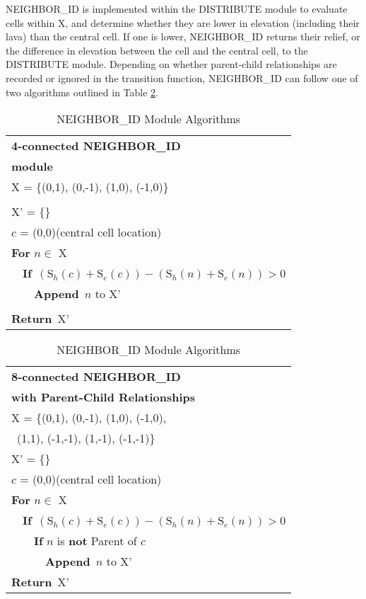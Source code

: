 		NEIGHBOR\_ID is implemented within the DISTRIBUTE module to evaluate cells within X, and determine whether they are lower in elevation (including their lava) than the central cell. If one is lower, NEIGHBOR\_ID returns their relief, or the difference in elevation between the cell and the central cell, to the DISTRIBUTE module. Depending on whether parent-child relationships are recorded or ignored in the transition function, NEIGHBOR\_ID can follow one of two algorithms outlined in Table \ref{tab_neighalg}.
	\begin{table}[h]
		\centering
		\caption{NEIGHBOR\_ID Module Algorithms}
		\begin{tabular}{l}
			\toprule
			\textbf{4-connected NEIGHBOR\_ID}\\
			\textbf{module}\\
			\midrule
			X = \{(0,1), (0,-1), (1,0), (-1,0)\}\\\\
			X' = \{\}\\
			$c$ = (0,0)\qquad (central cell location)\\
			\textbf{For} $n\in$ X\\
			~~\textbf{If}~$(\text{S}_h(c)+\text{S}_e(c))-(\text{S}_h(n)+\text{S}_e(n)) > 0$\\
			~~~~\textbf{Append}~$n$ to X'\\\\
			\textbf{Return}~X'\\
			\bottomrule
		\end{tabular}
		\begin{tabular}{l}
			\toprule
			\textbf{8-connected NEIGHBOR\_ID}\\
			\textbf{with Parent-Child Relationships}\\
			\midrule
			X = \{(0,1), (0,-1), (1,0), (-1,0), \\
			\qquad~(1,1), (-1,-1), (1,-1), (-1,-1)\}\\
			X' = \{\}\\
			$c$ = (0,0)\qquad (central cell location)\\
			\textbf{For} $n\in$ X\\
			~~\textbf{If}~$(\text{S}_h(c)+\text{S}_e(c))-(\text{S}_h(n)+\text{S}_e(n)) > 0$\\
			~~~~\textbf{If} $n$ is \textbf{not} Parent of $c$\\
			~~~~~~\textbf{Append}~$n$ to X'\\
			\textbf{Return}~X'\\
			\bottomrule
		\end{tabular}
		\label{tab_neighalg}
	\end{table}
			
